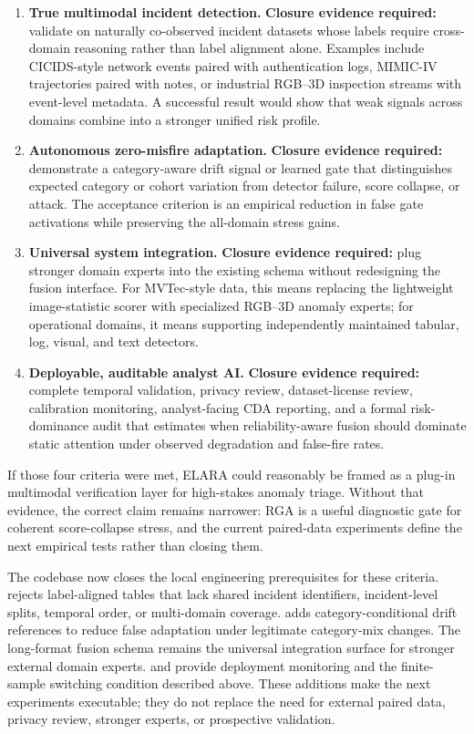 \documentclass[11pt]{article}
\newcommand{\system}{ELARA}
\newcommand{\method}{RGA}
\begin{document}
\begin{enumerate}
  \item \textbf{True multimodal incident detection.} \textbf{Closure evidence
  required:} validate on naturally co-observed incident datasets whose labels
  require cross-domain reasoning rather than label alignment alone. Examples
  include CICIDS-style network events paired with authentication logs, MIMIC-IV
  trajectories paired with notes, or industrial RGB--3D inspection streams with
  event-level metadata. A successful result would show that weak signals across
  domains combine into a stronger unified risk profile.
  \item \textbf{Autonomous zero-misfire adaptation.} \textbf{Closure evidence
  required:} demonstrate a category-aware drift signal or learned gate that
  distinguishes expected category or cohort variation from detector failure,
  score collapse, or attack. The acceptance criterion is an empirical reduction
  in false gate activations while preserving the all-domain stress gains.
  \item \textbf{Universal system integration.} \textbf{Closure evidence
  required:} plug stronger domain experts into the existing schema without
  redesigning the fusion interface. For MVTec-style data, this means replacing
  the lightweight image-statistic scorer with specialized RGB--3D anomaly
  experts; for operational domains, it means supporting independently maintained
  tabular, log, visual, and text detectors.
  \item \textbf{Deployable, auditable analyst AI.} \textbf{Closure evidence
  required:} complete temporal validation, privacy review, dataset-license
  review, calibration monitoring, analyst-facing CDA reporting, and a formal
  risk-dominance audit that estimates when reliability-aware fusion should
  dominate static attention under observed degradation and false-fire rates.
\end{enumerate}

If those four criteria were met, \system{} could reasonably be framed as a
plug-in multimodal verification layer for high-stakes anomaly triage. Without
that evidence, the correct claim remains narrower: \method{} is a useful
diagnostic gate for coherent score-collapse stress, and the current paired-data
experiments define the next empirical tests rather than closing them.

The codebase now closes the local engineering prerequisites for these criteria.
 rejects label-aligned tables that lack shared
incident identifiers, incident-level splits, temporal order, or multi-domain
coverage.  adds category-conditional
drift references to reduce false adaptation under legitimate category-mix
changes. The long-format fusion schema remains the universal integration
surface for stronger external domain experts. 
and  provide deployment monitoring and the
finite-sample switching condition described above. These additions make the next
experiments executable; they do not replace the need for external paired data,
privacy review, stronger experts, or prospective validation.
\end{document}
